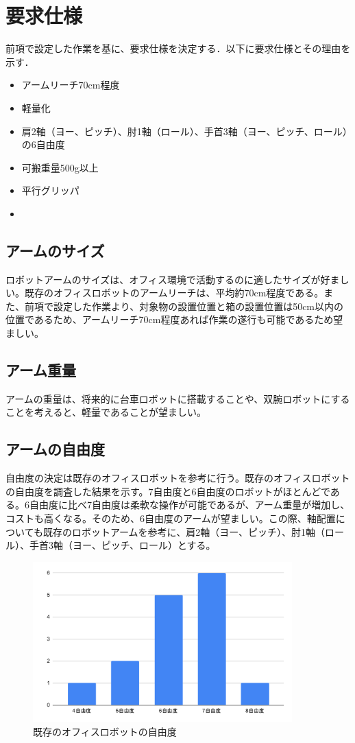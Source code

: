 \section{要求仕様}
前項で設定した作業を基に、要求仕様を決定する．以下に要求仕様とその理由を示す．
\begin{itemize}
  \item アームリーチ70cm程度
  \item 軽量化
  \item 肩2軸（ヨー、ピッチ）、肘1軸（ロール）、手首3軸（ヨー、ピッチ、ロール）の6自由度
  \item 可搬重量500g以上
  \item 平行グリッパ
  \item 
\end{itemize}
\subsection{アームのサイズ}
ロボットアームのサイズは、オフィス環境で活動するのに適したサイズが好ましい。既存のオフィスロボットのアームリーチは、平均約70cm程度である。また、前項で設定した作業より、対象物の設置位置と箱の設置位置は50cm以内の位置であるため、アームリーチ70cm程度あれば作業の遂行も可能であるため望ましい。
\subsection{アーム重量}
アームの重量は、将来的に台車ロボットに搭載することや、双腕ロボットにすることを考えると、軽量であることが望ましい。
\subsection{アームの自由度}
自由度の決定は既存のオフィスロボットを参考に行う。既存のオフィスロボットの自由度を調査した結果を示す。7自由度と6自由度のロボットがほとんどである。6自由度に比べ7自由度は柔軟な操作が可能であるが、アーム重量が増加し、コストも高くなる。そのため、6自由度のアームが望ましい。この際、軸配置についても既存のロボットアームを参考に、肩2軸（ヨー、ピッチ）、肘1軸（ロール）、手首3軸（ヨー、ピッチ、ロール）とする。

\begin{figure}[h]
  \centering
  \includegraphics[width=10cm]{images/armDof.pdf}
  \caption{既存のオフィスロボットの自由度}
  \label{fig:armDof}
\end{figure}

